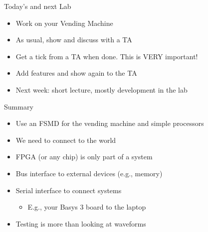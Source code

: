 \begin{frame}[fragile]{Today's  and next Lab}
\begin{itemize}
\item Work on your Vending Machine
\item As usual, show and discuss with a TA
\item Get a tick from a TA when done. This is VERY important!
\item Add features and show again to the TA
\item Next week: short lecture, mostly development in the lab
\end{itemize}
\end{frame}



\begin{frame}[fragile]{Summary}
\begin{itemize}
\item Use an FSMD for the vending machine and simple processors
\item We need to connect to the world
\item FPGA (or any chip) is only part of a system
\item Bus interface to external devices (e.g., memory)
\item Serial interface to connect systems
\begin{itemize}
\item E.g., your Basys 3 board to the laptop
\end{itemize}
\item Testing is more than looking at waveforms
\end{itemize}
\end{frame}





